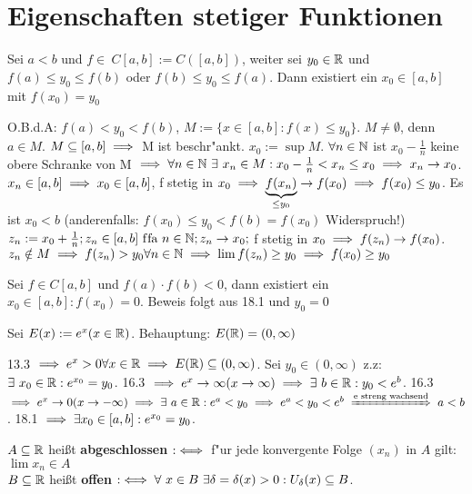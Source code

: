 \documentclass[a4paper,twoside,DIV15,BCOR12mm]{scrbook}
\begin{document}
\chapter{Eigenschaften stetiger Funktionen}

\begin{satz}[Zwischenwertsatz]
Sei $a<b$ und $f \in\ C[a, b]:=C([a, b])$, weiter sei $y_0 \in\mathbb{R}$ und $f(a) \le y_0 \le f(b)$ oder $f(b) \le y_0 \le f(a)$. Dann existiert ein $x_0 \in [a, b]$ mit $f(x_0)=y_0$
\end{satz}

\begin{beweis}
O.B.d.A: $f(a)<y_0<f(b)$, $M:=\{x \in [a,b]: f(x)\le y_0\}$. $M \ne \emptyset $, denn $a \in M$. $M \subseteq [a, b] \implies$ M ist beschr"ankt. $x_0:=\sup M$. $\forall n \in \mathbb{N}$ ist $x_0 - \frac{1}{n}$ keine obere Schranke von M $\implies \forall n\in\mathbb{N}\ \exists\ x_n\in M: x_0 - \frac{1}{n}<x_n\le x_0 \implies x_n \to x_0$. $x_n \in [a, b] \implies x_0 \in [a, b]$, f stetig in $x_0 \implies \underbrace{f(x_n)}_{\le y_0} \to f(x_0) \implies f(x_0)\le y_0$. Es ist $x_0<b$ (anderenfalls: $f(x_0) \le y_0 < f(b)=f(x_0)$ Widerspruch!) $z_n:=x_0+\frac{1}{n}; z_n \in [a, b] \text{ f\/fa } n\in\mathbb{N}; z_n \to x_0;$ f stetig in $x_0 \implies f(z_n) \to f(x_0)$. $z_n \notin M \implies f(z_n)>y_0 \forall n \in\mathbb{N} \implies \lim f(z_n) \ge y_0 \implies f(x_0) \ge y_0$
\end{beweis}

\begin{satz}
Sei $f \in C[a, b]$ und $f(a) \cdot f(b)<0$, dann existiert ein $x_0 \in [a, b]: f(x_0)=0$. Beweis folgt aus 18.1 und $y_0=0$
\end{satz}

\begin{anwendung}
Sei $E(x):=e^x (x \in\mathbb{R})$. Behauptung: $E(\mathbb{R})=(0, \infty)$
\end{anwendung}

\begin{beweis}
13.3 $\implies e^x>0 \forall x \in \mathbb{R} \implies E(\mathbb{R}) \subseteq (0, \infty)$. Sei $y_0 \in (0, \infty)$ z.z: $\exists\ x_0 \in \mathbb{R} : e^{x_0}=y_0$. 16.3 $\implies e^x \to \infty (x\to \infty) \implies \exists\ b \in\mathbb{R} : y_0 < e^b$. 16.3 $\folgt e^x \to 0 (x \to -\infty) \folgt \exists\ a \in\MdR : e^a < y_0 \folgt e^a < y_0 < e^b \folgtnach{e streng wachsend} a<b$. 18.1 $\implies \exists x_0 \in [a, b]: e^{x_0}=y_0$.
\end{beweis}

\begin{definition}
$A \subseteq \mathbb{R}$ heißt \textbf{abgeschlossen} $:\iff$ f"ur jede konvergente Folge $(x_n)$ in $A$ gilt: $\lim x_n \in A$\\
$B \subseteq \mathbb{R}$ heißt \textbf{offen} $:\iff \forall\ x \in B \ \exists \delta=\delta(x)>0 : U_\delta(x) \subseteq B$.
\end{definition}
\end{document}
